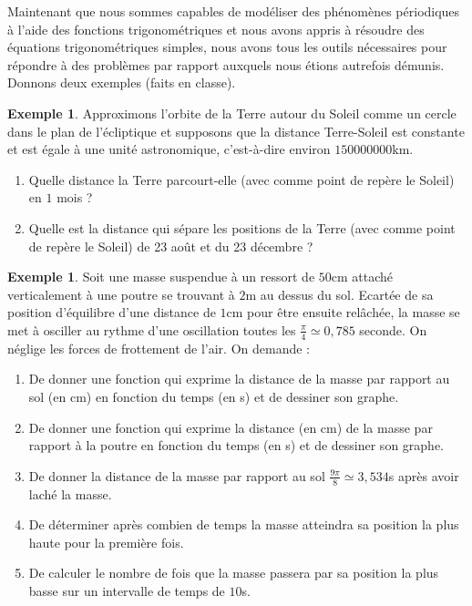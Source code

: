 \documentclass[a4paper,fontsize=13pt]{scrreprt}
\theoremstyle{plain}
\theoremstyle{definition}
\newtheorem{exe}[subsection]{Exemple}
\begin{document}
Maintenant que nous sommes capables de modéliser des phénomènes périodiques à l'aide des fonctions trigonométriques et nous avons appris à résoudre des équations trigonométriques simples, nous avons tous les outils nécessaires pour répondre à des problèmes par rapport auxquels nous étions autrefois démunis. Donnons deux exemples (faits en classe).

\begin{exe}
Approximons l'orbite de la Terre autour du Soleil comme un cercle dans le plan de l'écliptique et supposons que la distance Terre-Soleil est constante et est égale à une unité astronomique, c'est-à-dire environ $150000000$km.
\begin{enumerate}
\item Quelle distance la Terre parcourt-elle (avec comme point de repère le Soleil) en $1$ mois ?
\item Quelle est la distance qui sépare les positions de la Terre (avec comme point de repère le Soleil) de 23 août et du 23 décembre ?
\end{enumerate}
\end{exe}

\begin{exe}
Soit une masse suspendue à un ressort de $50$cm attaché verticalement à une poutre se trouvant à $2$m au dessus du sol. Ecartée de sa position d'équilibre d'une distance de $1$cm pour être ensuite relâchée, la masse se met à osciller au rythme d'une oscillation toutes les $\frac{\pi}{4} \simeq 0,785$ seconde. On néglige les forces de frottement de l'air. On demande :
\begin{enumerate}
\item De donner une fonction qui exprime la distance de la masse par rapport au sol (en cm) en fonction du temps (en s) et de dessiner son graphe.
\item De donner une fonction qui exprime la distance (en cm) de la masse par rapport à la poutre en fonction du temps (en s) et de dessiner son graphe.
\item De donner la distance de la masse par rapport au sol $\frac{9\pi}{8} \simeq 3,534$s après avoir laché la masse.
\item De déterminer après combien de temps la masse atteindra sa position la plus haute pour la première fois.
\item De calculer le nombre de fois que la masse passera par sa position la plus basse sur un intervalle de temps de $10$s.
\end{enumerate}
\end{exe}
\end{document}
